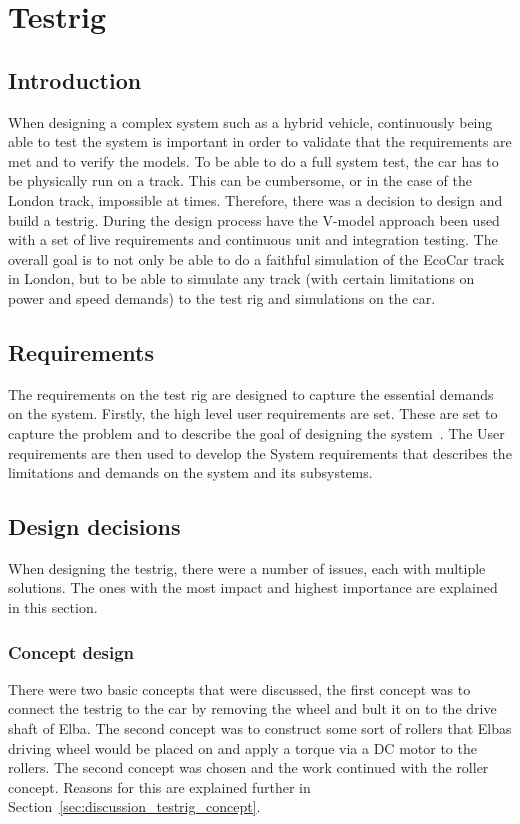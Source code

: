 \chapter{Testrig}
\section{Introduction}
When designing a complex system such as a hybrid vehicle, continuously being able to test
the system is important in order to validate that the requirements are met and to verify
the models. To be able to do a full system test, the car has to be physically run on a
track. This can be cumbersome, or in the case of the London track, impossible at times.
Therefore, there was a decision to design and build a testrig.  During the design process
have the V-model approach been used with a set of live requirements and continuous unit
and integration testing. The overall goal is to not only be able to do a faithful
simulation of the EcoCar track in London, but to be able to simulate any track (with
certain limitations on power and speed demands) to the test rig and simulations on the
car.

\section{Requirements}
The requirements on the test rig are designed to capture the essential demands on the
system. Firstly, the high level user requirements are set. These are set to capture the
problem and to describe the goal of designing the system~\cite{ibm_req}. The User
requirements are then used to develop the System requirements that describes the
limitations and demands on the system and its subsystems.

\section{Design decisions}
When designing the testrig, there were a number of issues, each with multiple solutions.
The ones with the most impact and highest importance are explained in this section.

\subsection{Concept design}\label{sec:testrig_design_concept}
There were two basic concepts that were discussed, the first concept was to connect the
testrig to the car by removing the wheel and bult it on to the drive shaft of Elba.
The second concept was to construct some sort of rollers that Elbas driving wheel would be
placed on and apply a torque via a DC motor to the rollers. The second concept was chosen
and the work continued with the roller concept. Reasons for this are explained further in
Section~\ref{sec:discussion_testrig_concept}.

